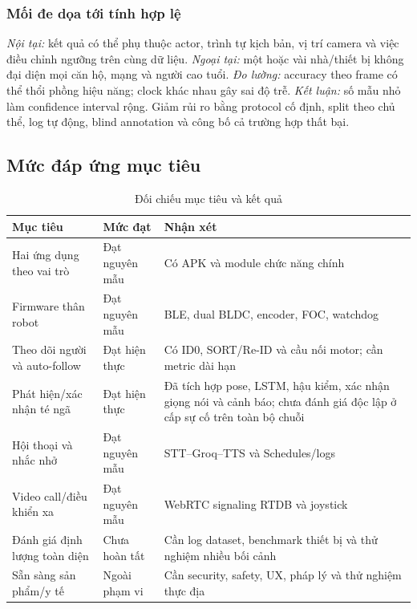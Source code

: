 \subsubsection{Mối đe dọa tới tính hợp lệ}

\textit{Nội tại:} kết quả có thể phụ thuộc actor, trình tự kịch bản, vị trí camera và việc điều chỉnh ngưỡng trên cùng dữ liệu. \textit{Ngoại tại:} một hoặc vài nhà/thiết bị không đại diện mọi căn hộ, mạng và người cao tuổi. \textit{Đo lường:} accuracy theo frame có thể thổi phồng hiệu năng; clock khác nhau gây sai độ trễ. \textit{Kết luận:} số mẫu nhỏ làm confidence interval rộng. Giảm rủi ro bằng protocol cố định, split theo chủ thể, log tự động, blind annotation và công bố cả trường hợp thất bại.

\subsection{Mức đáp ứng mục tiêu}

\begin{table}[htbp]
\centering
\caption{Đối chiếu mục tiêu và kết quả}
\label{tab:objective_results}
\small
\begin{tabularx}{\textwidth}{|p{4.0cm}|p{2.4cm}|X|}
\hline
\textbf{Mục tiêu} & \textbf{Mức đạt} & \textbf{Nhận xét} \\
\hline
Hai ứng dụng theo vai trò & Đạt nguyên mẫu & Có APK và module chức năng chính \\
\hline
Firmware thân robot & Đạt nguyên mẫu & BLE, dual BLDC, encoder, FOC, watchdog \\
\hline
Theo dõi người và auto-follow & Đạt hiện thực & Có ID0, SORT/Re-ID và cầu nối motor; cần metric dài hạn \\
\hline
Phát hiện/xác nhận té ngã & Đạt hiện thực & Đã tích hợp pose, LSTM, hậu kiểm, xác nhận giọng nói và cảnh báo; chưa đánh giá độc lập ở cấp sự cố trên toàn bộ chuỗi \\
\hline
Hội thoại và nhắc nhở & Đạt nguyên mẫu & STT--Groq--TTS và Schedules/logs \\
\hline
Video call/điều khiển xa & Đạt nguyên mẫu & WebRTC signaling RTDB và joystick \\
\hline
Đánh giá định lượng toàn diện & Chưa hoàn tất & Cần log dataset, benchmark thiết bị và thử nghiệm nhiều bối cảnh \\
\hline
Sẵn sàng sản phẩm/y tế & Ngoài phạm vi & Cần security, safety, UX, pháp lý và thử nghiệm thực địa \\
\hline
\end{tabularx}
\end{table}


